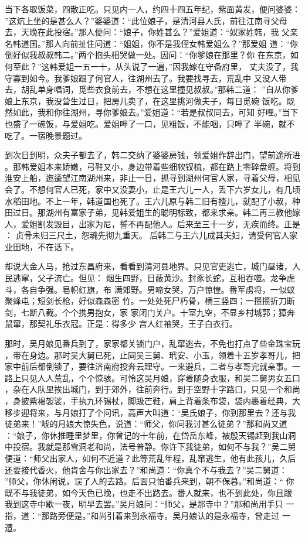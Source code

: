 当下各取饭菜，四散正吃。只见内一人，约四十四五年纪，紫面黄发，便问婆婆：
”这炕上坐的是甚么人？”婆婆道：“此位娘子，是清河县人氏，前往江南寻父母
去，天晚在此投宿。”那人便问：“娘子，你姓甚么？”爱姐道：“奴家姓韩，我
父亲名韩道国。”那人向前扯住问道：“姐姐，你不是我侄女韩爱姐么？”那爱姐
道：“你倒好似我叔叔韩二。”两个抱头相哭做一处。因问：“你爹娘在那里？你
在东京，如何至此？”这韩爱姐一五一十，从头说了一遍，”因我嫁在守备府里，
丈夫没了，我守寡到如今。我爹娘跟了何官人，往湖州去了。我要找寻去，荒乱中
又没人带去，胡乱单身唱词，觅些衣食前去，不想在这里撞见叔叔。”那韩二道：
”自从你爹娘上东京，我没营生过日，把房儿卖了，在这里挑河做夫子，每日觅碗
饭吃。既然如此，我和你往湖州，寻你爹娘去。”爱姐道：“若是叔叔同去，可知
好哩。”当下也盛了一碗饭，与爱姐吃。爱姐呷了一口，见粗饭，不能咽，只呷了
半碗，就不吃了。一宿晚景题过。

到次日到明，众夫子都去了，韩二交纳了婆婆房钱，领爱姐作辞出门，望前途所进
。那韩爱姐本来娇嫩，弓鞋又小，身边带着些细软钗梳，都在路上零碎盘缠。将到
淮安上船，迤逶望江南湖州来，非止一日，抓寻到湖州何官人家，寻着父母，相见
会了。不想何官人已死，家中又没妻小，止是王六儿一人，丢下六岁女儿，有几顷
水稻田地。不上一年，韩道国也死了。王六儿原与韩二旧有揸儿，就配了小叔，种
田过日。那湖州有富家子弟，见韩爱姐生的聪明标致，都来求亲。韩二再三教他嫁
人，爱姐割发毁目，出家为尼，誓不再配他人。后来至三十一岁，无疾而终。正是
：
贞骨未归三尺土，怨魂先彻九重天。
后韩二与王六儿成其夫妇，请受何官人家业田地，不在话下。

却说大金人马，抢过东昌府来，看看到清河县地界。只见官吏逃亡，城门昼诸，人
民逃窜，父子流亡。但见：
烟生四野，日蔽黄沙。封豕长蛇，互相吞噬。龙争虎斗，各自争强。皂帜红旗，布
满郊野。男啼女哭，万户惊惶。番军虏将，一似蚁聚蜂屯；短剑长枪，好似森森密
竹。一处处死尸朽骨，横三竖四；一攒攒折刀断剑，七断八截。个个携男抱女，家
家闭门关户。十室九空，不显乡村城郭；獐奔鼠窜，那契礼乐衣冠。正是：得多少
宫人红袖哭，王子白衣行。

那时，吴月娘见番兵到了，家家都关锁门户，乱窜逃去，不免也打点了些金珠宝玩
，带在身边。那时吴大舅已死，止同吴三舅、玳安、小玉，领着十五岁孝哥儿，把
家中前后都倒锁了，要往济南府投奔云理守。一来避兵，二者与孝哥完就亲事。一
路上只见人人荒乱，个个惊骇。可怜这吴月娘，穿着随身衣服，和吴二舅男女五口
，杂在人队里挨出城门，到于郊外，往前奔行。到于空野十字路口，只见一个和尚
，身披紫褐袈裟，手执九环锡杖，脚趿芒鞋，肩上背着条布袋，袋内裹着经典，大
移步迎将来，与月娘打了个问讯，高声大叫道：“吴氏娘子，你到那里去？还与我
徒弟来！”唬的月娘大惊失色，说道：“师父，你问我讨甚么徒弟？”那和尚又道
：“娘子，你休推睡里梦里，你曾记的十年前，在岱岳东峰，被殷天锡赶到我山洞
中投宿。我就是那雪洞老和尚，法号普静。你许下我徒弟，如何不与我？”吴二舅
便道：“师父出家人，如何不近道？此等荒乱年程，乱窜逃生，他有此孩儿，久后
还要接代香火，他肯舍与你出家去？”和尚道：“你真个不与我去？”吴二舅道：
”师父，你休闲说，误了人的去路。后面只怕番兵来到，朝不保暮。”和尚道：“
你既不与我徒弟，如今天色已晚，也走不出路去。番人就来，也不到此处，你且跟
我到这寺中歇一夜，明早去罢。”吴月娘问：“师父，是那寺中？”那和尚用手只
一指，道：“那路旁便是。”和尚引着来到永福寺。吴月娘认的是永福寺，曾走过
一遭。


